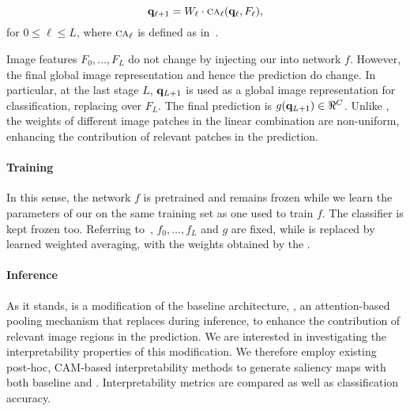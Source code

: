 \begin{equation}
	\mathbf{q}_{\ell+1} = W_\ell \cdot {\textsc{ca}}_\ell(\mathbf{q}_\ell, F_\ell),
\label{eq:qk-layer}
\end{equation}
for $0 \le \ell \le L$, where ${\textsc{ca}}_\ell$ is defined as in~. 


\noindent Image features $F_0, \dots, F_L$ do not change by injecting our \Ours into network $f$. 
However, the final global image representation and hence the prediction do change. In particular, 
at the last stage $L$, $\mathbf{q}_{L+1}$ is used as a global image representation for classification, 
replacing \gap over $F_L$. The final prediction is $g(\vq_{L+1}) \in \real^C$. Unlike \gap, the 
weights of different image patches in the linear combination are non-uniform, enhancing the 
contribution of relevant patches in the prediction.

\paragraph{Training}

In this sense, the network $f$ is pretrained and remains frozen while we learn the parameters of 
our \Ours on the same training set as one used to train $f$. The classifier is kept frozen too. 
Referring to~, $f_0, \dots, f_L$ and $g$ are fixed, while \gap is replaced by learned 
weighted averaging, with the weights obtained by the \Ours.

\paragraph{Inference}
As it stands, \Ours is a modification of the baseline architecture, \ie, an attention-based pooling 
mechanism that replaces \gap during inference, to enhance the contribution of relevant image regions 
in the prediction. We are interested in investigating the interpretability properties of this 
modification. We therefore employ existing post-hoc, CAM-based interpretability methods to generate 
saliency maps with both baseline \gap and \Ours. Interpretability metrics are compared as well as 
classification accuracy.
